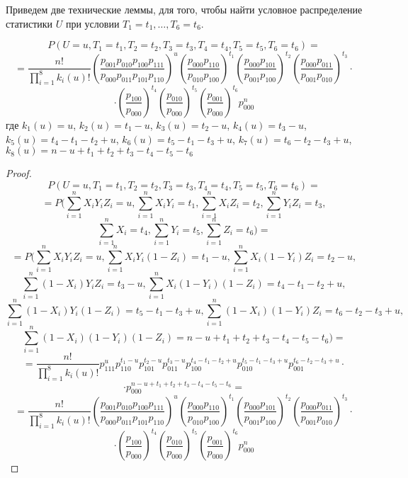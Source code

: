 Приведем две технические леммы, для того, чтобы найти условное распределение статистики $U$ при условии $T_1=t_1,\ldots,T_6=t_6$.
\begin{lemma}
    $$P(U=u, T_1=t_1, T_2=t_2, T_3=t_3, T_4=t_4, T_5=t_5, T_6=t_6)=$$
    $$=\frac{n!}{\prod_{i=1}^8 k_i(u)!} \left(\dfrac{p_{001}p_{010}p_{100}p_{111}}{p_{000}p_{011}p_{101}p_{110}}\right)^u
        \left(\dfrac{p_{000} p_{110}}{p_{010} p_{100}}\right)^{t_1}\left(\dfrac{p_{000}p_{101}}{p_{001}p_{100}}\right)^{t_2}
        \left(\dfrac{p_{000}p_{011}}{p_{001}p_{010}}\right)^{t_3} \cdot$$
    $$
        \cdot\left(\dfrac{p_{100}}{p_{000}}\right)^{t_4}
        \left(\dfrac{p_{010}}{p_{000}}\right)^{t_5} \left(\dfrac{p_{001}}{p_{000}}\right)^{t_6} p_{000}^n
    $$
    где
    $k_1(u)=u$, $k_2(u)=t_1-u$, $k_3(u)=t_2-u$, $k_4(u)=t_3-u$, $k_5(u)=t_4-t_1-t_2+u$, $k_6(u)=t_5-t_1-t_3+u$,
    $k_7(u)=t_6 - t_2 - t_3 + u$, $k_8(u)=n-u+t_1+t_2+t_3-t_4-t_5-t_6$
\end{lemma}
\begin{proof}
    $$
        P(U=u, T_1=t_1, T_2=t_2, T_3=t_3, T_4=t_4, T_5=t_5, T_6=t_6)=
    $$
    $$
        =P\biggl(\sum_{i=1}^n X_i Y_i Z_i=u, \sum_{i=1}^n X_i Y_i=t_1, \sum_{i=1}^n X_i Z_i=t_2,\sum_{i=1}^n Y_i Z_i=t_3,
        $$
        $$
        \sum_{i=1}^n X_i=t_4,\sum_{i=1}^n Y_i=t_5, \sum_{i=1}^n Z_i=t_6\biggr)=
    $$
    $$
        =P\biggl(\sum_{i=1}^n X_i Y_i Z_i=u, \sum_{i=1}^n X_i Y_i (1- Z_i)=t_1-u, \sum_{i=1}^n X_i (1-Y_i) Z_i=t_2-u,
    $$
    $$
        \sum_{i=1}^n (1-X_i) Y_i Z_i=t_3-u,
        \sum_{i=1}^{n} X_i(1-Y_i)(1-Z_i)=t_4-t_1-t_2+u,
    $$
    $$
        \sum_{i=1}^{n} (1-X_i)Y_i(1-Z_i)=t_5-t_1-t_3+u,
        \sum_{i=1}^{n} (1-X_i)(1-Y_i)Z_i = t_6 - t_2 - t_3 + u,
    $$
    $$
        \sum_{i=1}^n (1-X_i)(1-Y_i)(1-Z_i)=n-u+t_1+t_2+t_3-t_4-t_5-t_6\biggr)=
    $$
    $$
        = \frac{n!}{\prod_{i=1}^8 k_i(u)!} p_{111}^u p_{110}^{t_1-u} p_{101}^{t_2-u} p_{011}^{t_3-u}
        p_{100}^{t_4-t_1-t_2+u} p_{010}^{t_5-t_1-t_3+u} p_{001}^{t_6 - t_2 - t_3 + u} \cdot
    $$
    $$
        \cdot p_{000}^{n-u+t_1+t_2+t_3-t_4-t_5-t_6}
        =
    $$
    $$=\frac{n!}{\prod_{i=1}^8 k_i(u)!} \left(\dfrac{p_{001}p_{010}p_{100}p_{111}}{p_{000}p_{011}p_{101}p_{110}}\right)^u
        \left(\dfrac{p_{000} p_{110}}{p_{010} p_{100}}\right)^{t_1}\left(\dfrac{p_{000}p_{101}}{p_{001}p_{100}}\right)^{t_2}
        \left(\dfrac{p_{000}p_{011}}{p_{001}p_{010}}\right)^{t_3} \cdot$$
    $$
        \cdot\left(\dfrac{p_{100}}{p_{000}}\right)^{t_4}
        \left(\dfrac{p_{010}}{p_{000}}\right)^{t_5} \left(\dfrac{p_{001}}{p_{000}}\right)^{t_6} p_{000}^n
    $$
\end{proof}


